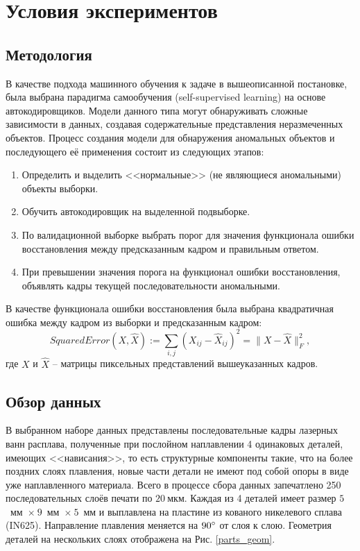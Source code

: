 \documentclass{article}
\begin{document}
\section{Условия экспериментов}
\subsection{Методология}
    В качестве подхода машинного обучения к задаче в вышеописанной постановке, была выбрана парадигма самообучения (self-supervised learning) на основе автокодировщиков. Модели данного типа могут обнаруживать сложные зависимости в данных, создавая содержательные представления неразмеченных объектов. Процесс создания модели для обнаружения аномальных объектов и последующего её применения состоит из следующих этапов:\begin{enumerate}
        \item Определить и выделить <<нормальные>> (не являющиеся аномальными) объекты выборки.
        \item Обучить автокодировщик на выделенной подвыборке.
        \item По валидационной выборке выбрать порог для значения функционала ошибки восстановления между предсказанным кадром и правильным ответом.
        \item При превышении значения порога на функционал ошибки восстановления, объявлять кадры текущей последовательности аномальными.
    \end{enumerate}
    В качестве функционала ошибки восстановления была выбрана квадратичная ошибка между кадром из выборки и предсказанным кадром: \begin{equation}\label{mse}
        SquaredError(X, \hat{X}) := \sum\limits_{i, j} (X_{ij} - \hat{X}_{ij})^2 = \|X - \hat{X}\|_F^2,
    \end{equation} где $X$ и $\hat{X}$ -- матрицы пиксельных представлений вышеуказанных кадров. 
    

\subsection{Обзор данных}
    В выбранном наборе данных представлены последовательные кадры лазерных ванн расплава, полученные при послойном наплавлении 4 одинаковых деталей, имеющих <<нависания>>, то есть структурные компоненты такие, что на более поздних слоях плавления, новые части детали не имеют под собой опоры в виде уже наплавленного материала. Всего в процессе сбора данных запечатлено 250 последовательных слоёв печати по $20~мкм$. Каждая из 4 деталей имеет размер $5$~мм~$\times~9$~мм~$\times~5$~мм и выплавлена на пластине из кованого никелевого сплава (IN625). Направление плавления меняется на $90\degree$ от слоя к слою. Геометрия деталей на нескольких слоях отображена на Рис. \ref{parts_geom}.
\end{document}
